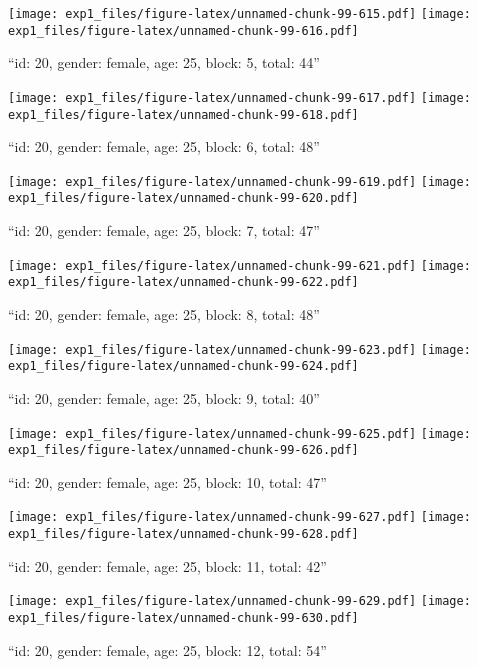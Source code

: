 \documentclass[,]{article}
\begin{document}
\texttt{[image: exp1\_files/figure-latex/unnamed-chunk-99-615.pdf]}
\texttt{[image: exp1\_files/figure-latex/unnamed-chunk-99-616.pdf]}

\newpage
[1] 

``id: 20, gender: female, age: 25, block: 5, total: 44''

\texttt{[image: exp1\_files/figure-latex/unnamed-chunk-99-617.pdf]}
\texttt{[image: exp1\_files/figure-latex/unnamed-chunk-99-618.pdf]}

\newpage
[1] 

``id: 20, gender: female, age: 25, block: 6, total: 48''

\texttt{[image: exp1\_files/figure-latex/unnamed-chunk-99-619.pdf]}
\texttt{[image: exp1\_files/figure-latex/unnamed-chunk-99-620.pdf]}

\newpage
[1] 

``id: 20, gender: female, age: 25, block: 7, total: 47''

\texttt{[image: exp1\_files/figure-latex/unnamed-chunk-99-621.pdf]}
\texttt{[image: exp1\_files/figure-latex/unnamed-chunk-99-622.pdf]}

\newpage
[1] 

``id: 20, gender: female, age: 25, block: 8, total: 48''

\texttt{[image: exp1\_files/figure-latex/unnamed-chunk-99-623.pdf]}
\texttt{[image: exp1\_files/figure-latex/unnamed-chunk-99-624.pdf]}

\newpage
[1] 

``id: 20, gender: female, age: 25, block: 9, total: 40''

\texttt{[image: exp1\_files/figure-latex/unnamed-chunk-99-625.pdf]}
\texttt{[image: exp1\_files/figure-latex/unnamed-chunk-99-626.pdf]}

\newpage
[1] 

``id: 20, gender: female, age: 25, block: 10, total: 47''

\texttt{[image: exp1\_files/figure-latex/unnamed-chunk-99-627.pdf]}
\texttt{[image: exp1\_files/figure-latex/unnamed-chunk-99-628.pdf]}

\newpage
[1] 

``id: 20, gender: female, age: 25, block: 11, total: 42''

\texttt{[image: exp1\_files/figure-latex/unnamed-chunk-99-629.pdf]}
\texttt{[image: exp1\_files/figure-latex/unnamed-chunk-99-630.pdf]}

\newpage
[1] 

``id: 20, gender: female, age: 25, block: 12, total: 54''
\end{document}
